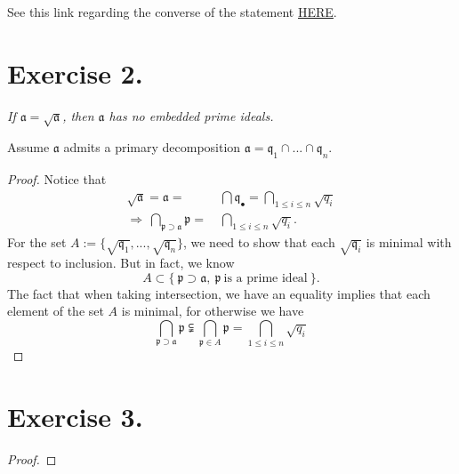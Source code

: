 See this link regarding the converse of the statement \href{https://math.stackexchange.com/questions/207406/irreducible-components-of-the-prime-spectrum-of-a-quotient-ring-and-primary-deco}{HERE}.

\section{Exercise 2.}
\textit{If $\mathfrak a = \sqrt{\mathfrak a}$, then $\mathfrak a$ has no embedded prime ideals.}

    Assume $\mathfrak a$ admits a primary decomposition $\mathfrak a = \mathfrak q_1\cap...\cap\mathfrak q_n$.
\begin{proof}
    Notice that 
    \begin{align*}
        \sqrt{\mathfrak a}=\mathfrak a =&~ \bigcap \mathfrak q_{\bullet}=\bigcap_{1\leq i\leq n}\sqrt{q_i}\\
        \Rightarrow~ \bigcap_{\mathfrak p\supset \mathfrak a}\mathfrak p=&~\bigcap_{1\leq i\leq n}\sqrt{q_i}.
    \end{align*}
    For the set $A:=\{\sqrt{\mathfrak q_1},...,\sqrt{\mathfrak q_n}\}$, we need to show that each $\sqrt{\mathfrak q_i}$ is minimal with respect to inclusion. But in fact, we know 
    \[A\subset\{~ \mathfrak p\supset \mathfrak a,~\mathfrak p ~\text{is a prime ideal}~\}.\]
    The fact that when taking intersection, we have an equality implies that each element of the set $A$ is minimal, for otherwise we have 
    \[\bigcap_{\mathfrak p\supset \mathfrak a}\mathfrak p \subsetneqq \bigcap_{\mathfrak p\in A}\mathfrak p=\bigcap_{1\leq i\leq n}\sqrt{q_i}\]
\end{proof}

\section{Exercise 3.}
\textit{}

\begin{proof}
    
\end{proof}